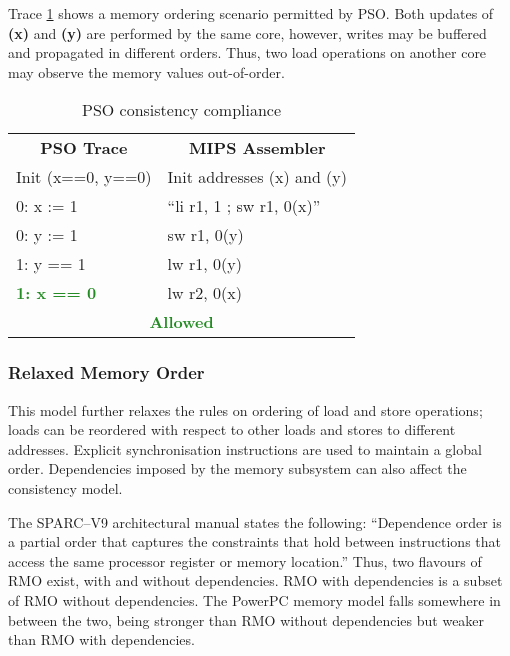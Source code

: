 			Trace \ref{pso_compliance} shows a memory ordering scenario permitted by PSO. Both updates of \textbf{(x)} and \textbf{(y)} are performed by the same core, however, writes may be buffered and propagated in different orders. Thus, two load operations on another core may observe the memory values out-of-order.
			
			\captionsetup[table]{name=Trace}
			\begin{table}[!h]
			\begin{center}
			\selectfont
			\begin{tabular}{|l|l|}
				\hline
				\multicolumn{1}{|c|}{\textbf{PSO Trace}} & \multicolumn{1}{c|}{\textbf{MIPS Assembler}} \\
				Init (x==0, y==0) & Init addresses (x) and (y) \\
				\hline
				0: x := 1 & ``li r1, 1 ; sw r1, 0(x)'' \\
				0: y := 1 & sw r1, 0(y) \\
				1: y == 1 & lw r1, 0(y) \\
				\textbf{\textcolor{ForestGreen}{1: x == 0}} & lw r2, 0(x) \\
				\hline
				\multicolumn{2}{|c|}{\textbf{\textcolor{ForestGreen}{Allowed}}} \\
				\hline
			\end{tabular}
			\caption{PSO consistency compliance}
			\label{pso_compliance}
			\end{center} 
			\end{table}
			\captionsetup[table]{name=Table}

		\subsubsection{Relaxed Memory Order}
			\label{section_rmo}
			This model further relaxes the rules on ordering of load and store operations; loads can be reordered with respect to other loads and stores to different addresses. Explicit synchronisation instructions are used to maintain a global order. Dependencies imposed by the memory subsystem can also affect the consistency model. 
			
			The SPARC--V9 architectural manual \cite{SPARCInternational94} states the following: ``Dependence order is a partial order that captures the constraints that hold between instructions that access the same processor register or memory location.'' Thus, two flavours of RMO exist, with and without dependencies. RMO with dependencies is a subset of RMO without dependencies. The PowerPC memory model falls somewhere in between the two, being stronger than RMO without dependencies but weaker than RMO with dependencies.

